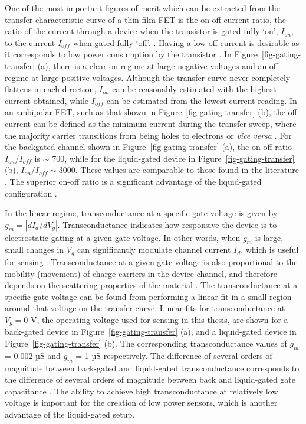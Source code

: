 \documentclass[
  a4paper,
]{scrbook}
\begin{document}
One of the most important figures of merit which can be extracted from
the transfer characteristic curve of a thin-film FET is the on-off
current ratio, the ratio of the current through a device when the
transistor is gated fully `on', \(I_{on}\), to the current \(I_{off}\)
when gated fully `off'. \autocite{Kauffman2008,Petti2016,Shkodra2021}.
Having a low off current is desirable as it corresponds to low power
consumption by the transistor \autocite{Rouhi2010}. In
Figure~\ref{fig-gating-transfer} (a), there is a clear on regime at
large negative voltages and an off regime at large positive voltages.
Although the transfer curve never completely flattens in each direction,
\(I_{on}\) can be reasonably estimated with the highest current
obtained, while \(I_{off}\) can be estimated from the lowest current
reading. In an ambipolar FET, such as that shown in
Figure~\ref{fig-gating-transfer} (b), the off current can be defined as
the minimum current during the transfer sweep, where the majority
carrier transitions from being holes to electrons or \emph{vice versa}
\autocite{Petti2016,Zheng2017}. For the backgated channel shown in
Figure~\ref{fig-gating-transfer} (a), the on-off ratio
\(I_{on}/I_{off}\) is \(\sim\) 700, while for the liquid-gated device in
Figure~\ref{fig-gating-transfer} (b), \(I_{on}/I_{off} \sim 3000\).
These values are comparable to those found in the literature
\autocite{Avouris2007,Kauffman2008,Heller2010}. The superior on-off
ratio is a significant advantage of the liquid-gated configuration
\autocite{Shkodra2021}.

In the linear regime, transconductance at a specific gate voltage is
given by \(g_m = |dI_{d}/dV_g|\). Transconductance indicates how
responsive the device is to electrostatic gating at a given gate
voltage. In other words, when \(g_m\) is large, small changes in \(V_g\)
can significantly modulate channel current \(I_d\), which is useful for
sensing \autocite{Heller2009a,Ohno2015,Kireev2017}. Transconductance at
a given gate voltage is also proportional to the mobility (movement) of
charge carriers in the device channel, and therefore depends on the
scattering properties of the material
\autocite{Rouhi2010,Petti2016,Li2023}. The transconductance at a
specific gate voltage can be found from performing a linear fit in a
small region around that voltage on the transfer curve. Linear fits for
transconductance at \(V_g = 0\) V, the operating voltage used for
sensing in this thesis, are shown for a back-gated device in
Figure~\ref{fig-gating-transfer} (a), and a liquid-gated device in
Figure~\ref{fig-gating-transfer} (b). The corresponding transconductance
values of \(g_m\) = 0.002 µS and \(g_m\) = 1 µS respectively. The
difference of several orders of magnitude between back-gated and
liquid-gated transconductance corresponds to the difference of several
orders of magnitude between back and liquid-gated gate capacitance
\autocite{Tran2016,Shkodra2021}. The ability to achieve high
transconductance at relatively low voltage is important for the creation
of low power sensors, which is another advantage of the liquid-gated
setup.
\end{document}
